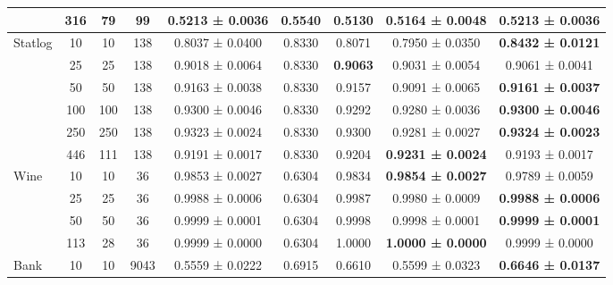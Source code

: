 \begin{table}
{\begin{tabular}[H]{@{}lcccccccc@{}}
                              & 316   & 79   & 99   & 0.5213 ± 0.0036      & 0.5540               & 0.5130          & 0.5164 ± 0.0048          & \textbf{0.5213 ± 0.0036} \\
                              \midrule
\multirow{6}{*}{Statlog}      & 10    & 10   & 138  & 0.8037 ± 0.0400      & 0.8330               & 0.8071          & 0.7950 ± 0.0350          & \textbf{0.8432 ± 0.0121} \\
                              & 25    & 25   & 138  & 0.9018 ± 0.0064      & 0.8330               & \textbf{0.9063} & 0.9031 ± 0.0054          & 0.9061 ± 0.0041          \\
                              & 50    & 50   & 138  & 0.9163 ± 0.0038      & 0.8330               & 0.9157          & 0.9091 ± 0.0065          & \textbf{0.9161 ± 0.0037} \\
                              & 100   & 100  & 138  & 0.9300 ± 0.0046      & 0.8330               & 0.9292          & 0.9280 ± 0.0036          & \textbf{0.9300 ± 0.0046} \\
                              & 250   & 250  & 138  & 0.9323 ± 0.0024      & 0.8330               & 0.9300          & 0.9281 ± 0.0027          & \textbf{0.9324 ± 0.0023} \\
                              & 446   & 111  & 138  & 0.9191 ± 0.0017      & 0.8330               & 0.9204          & \textbf{0.9231 ± 0.0024} & 0.9193 ± 0.0017          \\
                              \midrule
\multirow{4}{*}{Wine}         & 10    & 10   & 36   & 0.9853 ± 0.0027      & 0.6304               & 0.9834          & \textbf{0.9854 ± 0.0027} & 0.9789 ± 0.0059          \\
                              & 25    & 25   & 36   & 0.9988 ± 0.0006      & 0.6304               & 0.9987          & 0.9980 ± 0.0009          & \textbf{0.9988 ± 0.0006} \\
                              & 50    & 50   & 36   & 0.9999 ± 0.0001      & 0.6304               & 0.9998          & 0.9998 ± 0.0001          & \textbf{0.9999 ± 0.0001} \\
                              & 113   & 28   & 36   & 0.9999 ± 0.0000      & 0.6304               & 1.0000          & \textbf{1.0000 ± 0.0000} & 0.9999 ± 0.0000          \\
                              \midrule
\multirow{7}{*}{Bank}         & 10    & 10   & 9043 & 0.5559 ± 0.0222      & 0.6915               & 0.6610          & 0.5599 ± 0.0323          & \textbf{0.6646 ± 0.0137} \\

\end{tabular}}
\end{table}
